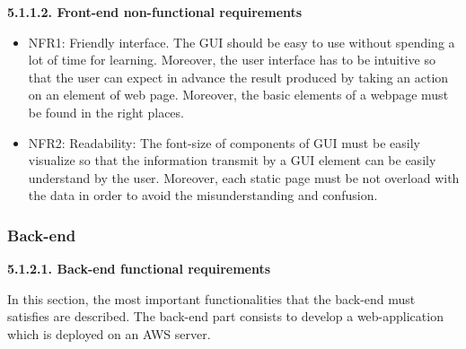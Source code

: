 \documentclass[conference,compsoc]{IEEEtran}
\begin{document}
\noindent
\newline\newline
\textbf{5.1.1.2. Front-end non-functional requirements}
\newline

\begin{itemize}
\item NFR1: Friendly interface. The GUI should be easy to use without spending a lot of time for learning. Moreover, the user interface has to be intuitive so that the user can expect in advance the result produced by taking an action on an element of web page. Moreover, the basic elements of a webpage must be found in the right places. 
\newline
\item NFR2: Readability: The font-size of components of GUI must be easily visualize so that the information transmit by a GUI element can be easily understand by the user. Moreover, each static page must be not overload with the data in order to avoid the misunderstanding and confusion. 
\end{itemize}

\newpage
\subsubsection{Back-end}

\noindent
\newline\newline
\textbf{5.1.2.1. Back-end functional requirements}
\newline

In this section, the most important functionalities that the back-end must satisfies are described. The back-end part consists to develop a web-application which is deployed on an AWS server. 
\newline
\end{document}
